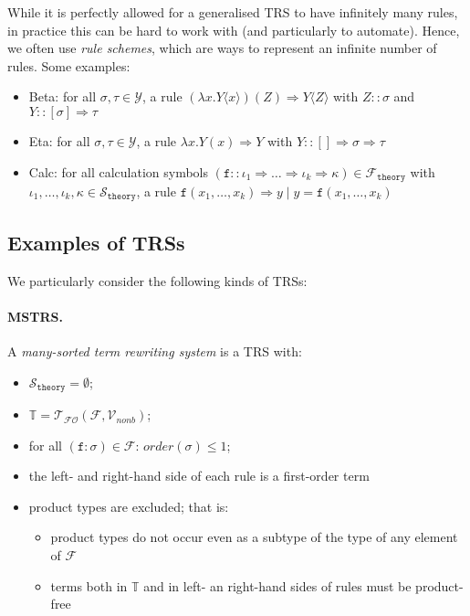 \documentclass{lmcs}
\theoremstyle{theorem}\newtheorem{theorem}{Theorem}
\theoremstyle{theorem}\newtheorem{lemma}[theorem]{Lemma}
\theoremstyle{theorem}\newtheorem{corollary}[theorem]{Corollary}
\theoremstyle{definition}\newtheorem{definition}[theorem]{Definition}
\theoremstyle{definition}\newtheorem{example}[theorem]{Example}
\newcommand{\F}{\mathcal{F}}
\newcommand{\thF}{\mathcal{F}_{\mathtt{theory}}}
\newcommand{\Vfree}{\mathcal{V}_{\mathit{nonb}}}
\newcommand{\thSorts}{\mathcal{S}_{\mathtt{theory}}}
\newcommand{\Types}{\mathcal{Y}}
\newcommand{\FOTerms}{\mathcal{T}_{\mathcal{FO}}}
\newcommand{\termsset}{\mathbb{T}}
\newcommand{\order}{\mathit{order}}
\newcommand{\asort}{\iota}
\newcommand{\bsort}{\kappa}
\newcommand{\atype}{\sigma}
\newcommand{\btype}{\tau}
\newcommand{\identifier}[1]{\mathtt{#1}}
\newcommand{\afun}{\identifier{f}}
\newcommand{\avar}{x}
\newcommand{\bvar}{y}
\newcommand{\Bvar}{Y}
\newcommand{\Cvar}{Z}
\newcommand{\abs}[2]{\lambda #1.#2}
\newcommand{\meta}[2]{#1\langle#2\rangle}
\newcommand{\tuple}[2]{\llparenthesis #1,\dots,#2 \rrparenthesis}
\newcommand{\arrtype}{\Rightarrow}
\newcommand{\arrz}{\Rightarrow}
\newcommand{\myparagraph}[1]{\paragraph{\textbf{#1.}}}
\begin{document}
While it is perfectly allowed for a generalised TRS to have infinitely many
rules, in practice this can be hard to work with (and particularly to automate).
Hence, we often use \emph{rule schemes}, which are ways to represent an infinite
number of rules.  Some examples:
\begin{itemize}
\item Beta: for all $\atype,\btype \in \Types$,
  a rule $(\abs{\avar}{\meta{\Bvar}{\avar}})(\Cvar) \arrz \meta{\Bvar}{\Cvar}$
  with $\Cvar :: \atype$ and $\Bvar :: [\atype] \arrtype \btype$
\item Eta: for all $\atype,\btype \in \Types$,
  a rule $\abs{\avar}{\Bvar(\avar)} \arrz \Bvar$
  with $\Bvar :: [] \arrtype \atype \arrtype \btype$
\item Calc: for all calculation symbols $(\afun :: \asort_1 \arrtype \dots
  \arrtype \asort_k \arrtype \bsort) \in  \thF$ with $\asort_1,\dots,\asort_k,
  \bsort \in \thSorts$, a rule $\afun(\avar_1,\dots,\avar_k) \arrz \bvar \mid
  \bvar = \afun(\avar_1,\dots,\avar_k)$
\end{itemize}

\subsection{Examples of TRSs}

We particularly consider the following kinds of TRSs:

\myparagraph{MSTRS}
A \emph{many-sorted term rewriting system} is a TRS with:
\begin{itemize}
\item $\thSorts = \emptyset$;
\item $\termsset = \FOTerms(\F,\Vfree)$;
\item for all $(\afun : \atype) \in \F$: $\order(\atype) \leq 1$;
\item the left- and right-hand side of each rule is a first-order term
\item product types are excluded; that is:
  \begin{itemize}
  \item product types do not occur even as a subtype of the type of any
    element of $\F$
  \item terms both in $\termsset$ and in left- an right-hand sides of rules must
    be product-free
  \end{itemize}
\end{itemize}
\end{document}
